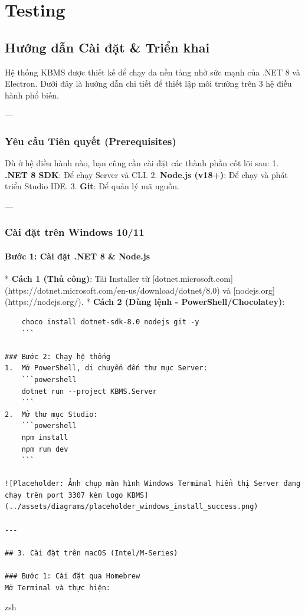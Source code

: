 \chapter{Testing}
\section{Hướng dẫn Cài đặt & Triển khai}

Hệ thống KBMS được thiết kế để chạy đa nền tảng nhờ sức mạnh của .NET 8 và Electron. Dưới đây là hướng dẫn chi tiết để thiết lập môi trường trên 3 hệ điều hành phổ biến.

---

\subsection{Yêu cầu Tiên quyết (Prerequisites)}

Dù ở hệ điều hành nào, bạn cũng cần cài đặt các thành phần cốt lõi sau:
1.  \textbf{.NET 8 SDK}: Để chạy Server và CLI.
2.  \textbf{Node.js (v18+)}: Để chạy và phát triển Studio IDE.
3.  \textbf{Git}: Để quản lý mã nguồn.

---

\subsection{Cài đặt trên Windows 10/11}

\subsubsection{Bước 1: Cài đặt .NET 8 & Node.js}
*   \textbf{Cách 1 (Thủ công)}: Tải Installer từ [dotnet.microsoft.com](https://dotnet.microsoft.com/en-us/download/dotnet/8.0) và [nodejs.org](https://nodejs.org/).
*   \textbf{Cách 2 (Dùng lệnh - PowerShell/Chocolatey)}:
    \begin{verbatim}
    choco install dotnet-sdk-8.0 nodejs git -y
    ```

### Bước 2: Chạy hệ thống
1.  Mở PowerShell, di chuyển đến thư mục Server:
    ```powershell
    dotnet run --project KBMS.Server
    ```
2.  Mở thư mục Studio:
    ```powershell
    npm install
    npm run dev
    ```

![Placeholder: Ảnh chụp màn hình Windows Terminal hiển thị Server đang chạy trên port 3307 kèm logo KBMS](../assets/diagrams/placeholder_windows_install_success.png)

---

## 3. Cài đặt trên macOS (Intel/M-Series)

### Bước 1: Cài đặt qua Homebrew
Mở Terminal và thực hiện:
\end{verbatim}zsh
